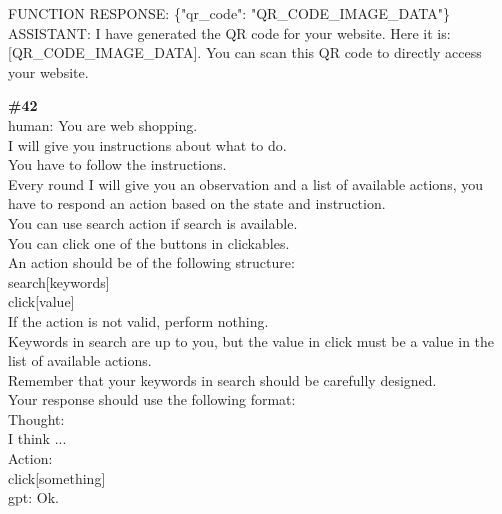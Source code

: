 \documentclass[10pt]{article}
\begin{document}
\begin{Form}
\begin{tcolorbox}[colback=convbg,colframe=itemframe,boxrule=0.8pt,arc=2pt,breakable,left=6pt,right=6pt,top=5pt,bottom=5pt]
{FUNCTION RESPONSE: \{"qr\_code": "QR\_CODE\_IMAGE\_DATA"\} \\[2pt]
ASSISTANT: I have generated the QR code for your website. Here it is: [QR\_CODE\_IMAGE\_DATA]. You can scan this QR code to directly access your website.  }
\end{tcolorbox}
\vspace{-1pt}
\CheckBox[name=q41c,width=1.6ex,height=1.6ex,bordercolor={0.45 0.45 0.45}]{~\textcolor{cbox}{COMPACT}}\quad
\CheckBox[name=q41d,width=1.6ex,height=1.6ex,bordercolor={0.45 0.45 0.45}]{~\textcolor{dbox}{DIFFUSE}}\quad
\CheckBox[name=q41n,width=1.6ex,height=1.6ex,bordercolor={0.45 0.45 0.45}]{~\textcolor{nbox}{NONE}}
\vspace{8pt}
\begin{tcolorbox}[colback=convbg,colframe=itemframe,boxrule=0.8pt,arc=2pt,breakable,left=6pt,right=6pt,top=5pt,bottom=5pt]
{\footnotesize\textbf{\#42}}\\[3pt]
{\footnotesize human: You are web shopping. \\[2pt]
I will give you instructions about what to do. \\[2pt]
You have to follow the instructions. \\[2pt]
Every round I will give you an observation and a list of available actions, you have to respond an action based on the state and instruction. \\[2pt]
You can use search action if search is available. \\[2pt]
You can click one of the buttons in clickables. \\[2pt]
An action should be of the following structure: \\[2pt]
search[keywords] \\[2pt]
click[value] \\[2pt]
If the action is not valid, perform nothing. \\[2pt]
Keywords in search are up to you, but the value in click must be a value in the list of available actions. \\[2pt]
Remember that your keywords in search should be carefully designed. \\[2pt]
Your response should use the following format: \\[2pt]
Thought: \\[2pt]
I think ... \\[2pt]
Action: \\[2pt]
click[something] \\[2pt]
gpt: Ok. \\[2pt]
}
\end{tcolorbox}
\end{Form}
\end{document}
